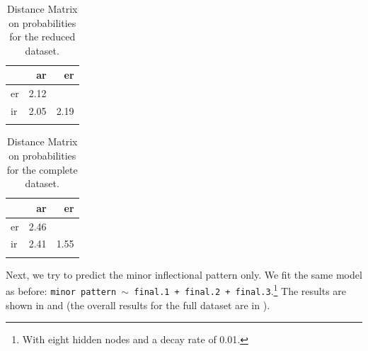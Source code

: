      

\begin{table}
    \caption{Distance Matrix on probabilities for the reduced dataset.}
    \label{tab:spanish-verbs-theme-dist-prob}
    \begin{tabular}{lrr}
      \lsptoprule
      & ar   & er   \\
      \midrule
      er & 2.12 &      \\
      ir & 2.05 & 2.19 \\
      \lspbottomrule
    \end{tabular}

\end{table}

\begin{table}
    
    \caption{Distance Matrix on probabilities for the complete dataset.}
    \label{tab:spanish-verbs-theme-dist-prob-2}
    \centering
    \begin{tabular}{lrr}
      \lsptoprule
      & ar   & er   \\
      \midrule
      er & 2.46 &      \\
      ir & 2.41 & 1.55 \\
      \lspbottomrule
    \end{tabular}


\end{table}


Next, we try to predict the minor inflectional pattern only. We fit the same model as before: \texttt{minor pattern $\sim$ final.1 + final.2 + final.3}.\footnote{With eight hidden nodes and a decay rate of 0.01.} The results are shown in  and  (the overall results for the full dataset are in ).

